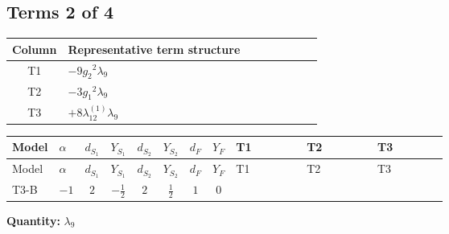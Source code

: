 \documentclass[8pt]{article}
\begin{document}
\begin{landscape}
\subsection*{Terms 2 of 4}
\begin{center}
\begin{tabular}{@{}c >{\raggedright\arraybackslash}p{0.82\linewidth}@{}}
\toprule
Column & Representative term structure \\
\midrule
T1 & \(\displaystyle -9 {g_2}^2 {\lambda_{9}}\) \\
\midrule
T2 & \(\displaystyle -3 {g_1}^2 {\lambda_{9}}\) \\
\midrule
T3 & \(\displaystyle +8 {\lambda_{12}^{(1)}} {\lambda_{9}}\) \\
\midrule
\bottomrule
\end{tabular}
\end{center}
\smallskip
\tiny
\begin{longtable}{@{}llcccccc >{\raggedright\arraybackslash}p{0.21\linewidth} >{\raggedright\arraybackslash}p{0.21\linewidth} >{\raggedright\arraybackslash}p{0.21\linewidth}@{}}
\toprule
Model & $\alpha$ & $d_{S_1}$ & $Y_{S_1}$ & $d_{S_2}$ & $Y_{S_2}$ & $d_F$ & $Y_F$ & T1 & T2 & T3 \\
\midrule
\endfirsthead
\toprule
Model & $\alpha$ & $d_{S_1}$ & $Y_{S_1}$ & $d_{S_2}$ & $Y_{S_2}$ & $d_F$ & $Y_F$ & T1 & T2 & T3 \\
\midrule
\endhead
T3-B & $-1$ & $2$ & $-\frac{1}{2}$ & $2$ & $\frac{1}{2}$ & $1$ & $0$ & \scriptsize\adjustbox{max width=\linewidth}{$\begin{gathered} -9 {g_2}^2 {\lambda_{9}}\end{gathered}$} & \scriptsize\adjustbox{max width=\linewidth}{$\begin{gathered} -3 {g_1}^2 {\lambda_{9}}\end{gathered}$} & \scriptsize\adjustbox{max width=\linewidth}{$\begin{gathered} +8 {\lambda_{12}^{(1)}} {\lambda_{9}}\end{gathered}$} \\
\midrule
\bottomrule
\end{longtable}
\clearpage
\noindent\textbf{Quantity: }$\lambda_{9}$\par\smallskip

\end{landscape}
\end{document}
